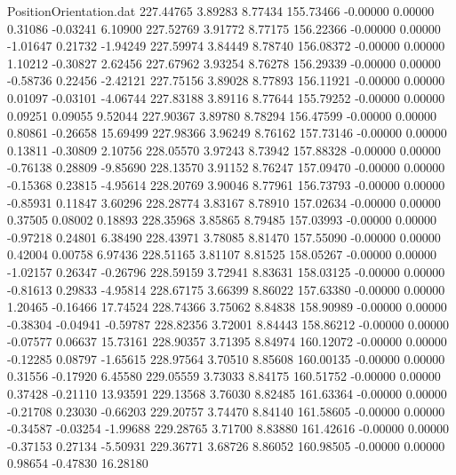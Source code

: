 \begin{filecontents}{PositionOrientation.dat}
 227.44765    3.89283    8.77434   155.73466   -0.00000    0.00000    0.31086   -0.03241    6.10900
 227.52769    3.91772    8.77175   156.22366   -0.00000    0.00000   -1.01647    0.21732   -1.94249
 227.59974    3.84449    8.78740   156.08372   -0.00000    0.00000    1.10212   -0.30827    2.62456
 227.67962    3.93254    8.76278   156.29339   -0.00000    0.00000   -0.58736    0.22456   -2.42121
 227.75156    3.89028    8.77893   156.11921   -0.00000    0.00000    0.01097   -0.03101   -4.06744
 227.83188    3.89116    8.77644   155.79252   -0.00000    0.00000    0.09251    0.09055    9.52044
 227.90367    3.89780    8.78294   156.47599   -0.00000    0.00000    0.80861   -0.26658   15.69499
 227.98366    3.96249    8.76162   157.73146   -0.00000    0.00000    0.13811   -0.30809    2.10756
 228.05570    3.97243    8.73942   157.88328   -0.00000    0.00000   -0.76138    0.28809   -9.85690
 228.13570    3.91152    8.76247   157.09470   -0.00000    0.00000   -0.15368    0.23815   -4.95614
 228.20769    3.90046    8.77961   156.73793   -0.00000    0.00000   -0.85931    0.11847    3.60296
 228.28774    3.83167    8.78910   157.02634   -0.00000    0.00000    0.37505    0.08002    0.18893
 228.35968    3.85865    8.79485   157.03993   -0.00000    0.00000   -0.97218    0.24801    6.38490
 228.43971    3.78085    8.81470   157.55090   -0.00000    0.00000    0.42004    0.00758    6.97436
 228.51165    3.81107    8.81525   158.05267   -0.00000    0.00000   -1.02157    0.26347   -0.26796
 228.59159    3.72941    8.83631   158.03125   -0.00000    0.00000   -0.81613    0.29833   -4.95814
 228.67175    3.66399    8.86022   157.63380   -0.00000    0.00000    1.20465   -0.16466   17.74524
 228.74366    3.75062    8.84838   158.90989   -0.00000    0.00000   -0.38304   -0.04941   -0.59787
 228.82356    3.72001    8.84443   158.86212   -0.00000    0.00000   -0.07577    0.06637   15.73161
 228.90357    3.71395    8.84974   160.12072   -0.00000    0.00000   -0.12285    0.08797   -1.65615
 228.97564    3.70510    8.85608   160.00135   -0.00000    0.00000    0.31556   -0.17920    6.45580
 229.05559    3.73033    8.84175   160.51752   -0.00000    0.00000    0.37428   -0.21110   13.93591
 229.13568    3.76030    8.82485   161.63364   -0.00000    0.00000   -0.21708    0.23030   -0.66203
 229.20757    3.74470    8.84140   161.58605   -0.00000    0.00000   -0.34587   -0.03254   -1.99688
 229.28765    3.71700    8.83880   161.42616   -0.00000    0.00000   -0.37153    0.27134   -5.50931
 229.36771    3.68726    8.86052   160.98505   -0.00000    0.00000    0.98654   -0.47830   16.28180

\end{filecontents}
